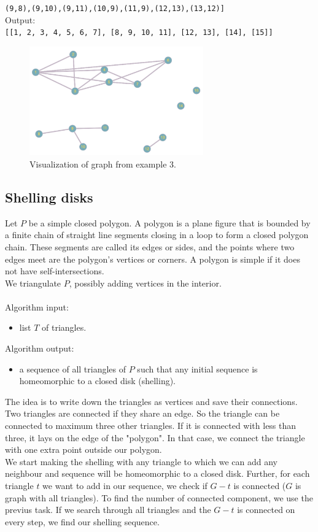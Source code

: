 \documentclass[a4paper,11pt]{article}
\begin{document}
\texttt{(9,8),(9,10),(9,11),(10,9),(11,9),(12,13),(13,12)]}
\\
Output: \\
\texttt{[[1, 2, 3, 4, 5, 6, 7], [8, 9, 10, 11], [12, 13], [14], [15]]}
\begin{figure}[ht!]
    \centering
    \includegraphics[width=75mm]{example3.png}
    \caption{Visualization of graph from example 3.}
\end{figure}

\subsection{Shelling disks}

Let $P$ be a simple closed polygon. A polygon is a plane figure that is bounded by a finite chain of straight line segments closing 
in a loop to form a closed polygon chain. These segments are called its edges or sides, and the points where two edges meet are the polygon's vertices or corners. 
A polygon is simple if it does not have self-intersections. 
\\
We triangulate $P$, possibly adding vertices in the interior. \\
\\ 
Algorithm input: 
\begin{itemize}
    \item list $T$ of triangles.
\end{itemize}
Algorithm output:
\begin{itemize}
    \item a sequence of all triangles of $P$ such that any initial sequence is homeomorphic to a closed disk (shelling).
\end{itemize}
\noindent
The idea is to write down the triangles as vertices and save their connections. Two triangles are connected if they share an edge.
So the triangle can be connected to maximum three other triangles. If it is connected with less than three, it lays on the edge of the "polygon". 
In that case, we connect the triangle with one extra point outside our polygon.
\\ 
We start making the shelling with any triangle to which we can add any neighbour and sequence will be homeomorphic to a closed disk.
Further, for each triangle $t$ we want to add in our sequence, we check if $G - t$ is connected ($G$ is graph with all triangles). To find the number of connected component, we use the previus task.
If we search through all triangles and the $G - t$ is connected on every step, we find our shelling sequence.
\end{document}
